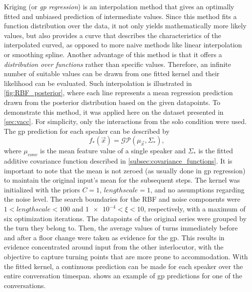 Kriging (or \textit{\acl{gp} regression}) is an interpolation method that gives an optimally fitted and unbiased prediction of intermediate values.
Since this method fits a function distribution over the data, it not only yields mathematically more likely values, but also provides a curve that describes the characteristics of the interpolated curved, as opposed to more naive methods like linear interpolation or smoothing spline.
Another advantage of this method is that it offers a \textit{distribution over functions} rather than specific values.
Therefore, an infinite number of suitable values can be drawn from one fitted kernel and their likelihood can be evaluated.
Such interpolation is illustrated in \cref{fig:RBF_posterior}, where each line represents a mean regression prediction drawn from the posterior distribution based on the given datapoints.
To demonstrate this method, it was applied here on the dataset presented in \cref{sec:vacc}.
For simplicity, only the interactions from the solo condition were used.
The \ac{gp} prediction for each speaker can be described by
%
\begin{equation}
	\label{eq:gp_function_prediction}
	f_*(\vec{x}) = \mathcal{GP}(\mu_{\vec{x}}, \Sigma_*),
\end{equation}
\noindent
%
where $\mu_{conv}$ is the mean feature value of a single speaker and $\Sigma_*$ is the fitted additive covariance function described in \cref{subsec:covariance_functions}.
It is important to note that the mean is not zeroed (as usually done in \ac{gp} regression) to maintain the original input's mean for the subsequent steps.
The kernel was initialized with the priors $C = 1$, $lengthscale = 1$, and no assumptions regarding the noise level.
The search boundaries for the RBF and noise components were $1 < lengthscale < 100$ and $\num{1e-4} < \xi < 10$, respectively, with a maximum of six optimization iterations.
The datapoints of the original series were grouped by the turn they belong to.
Then, the average values of turns immediately before and after a floor change were taken as evidence for the \ac{gp}.
This results in evidence concentrated around input from the other interlocutor, with the objective to capture turning points that are more prone to accommodation.
With the fitted kernel, a continuous prediction can be made for each speaker over the entire conversation timespan.
 shows an example of \ac{gp} predictions for one of the conversations.
